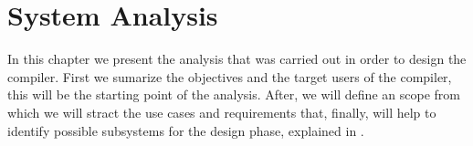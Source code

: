 \setchapterpreamble[u]{\margintoc}
\chapter{System Analysis}

In this chapter we present the analysis that was carried out in order to design the compiler. First we sumarize the objectives and the target users of the compiler, this will be the starting point of the analysis. After, we will define an scope from which we will stract the use cases and requirements that, finally, will help to identify possible subsystems for the design phase, explained in .









%